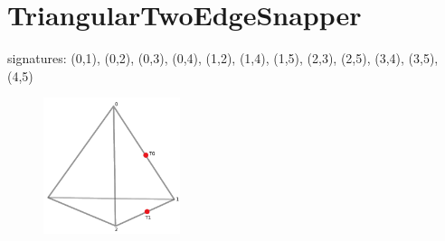 \documentclass{article}
\begin{document}
\begin{figure}[h!]
\end{figure}

\setcounter{subfigure}{0}
\clearpage

\section{TriangularTwoEdgeSnapper}

signatures: (0,1), (0,2), (0,3), (0,4), (1,2), (1,4), (1,5), (2,3),
(2,5), (3,4), (3,5), (4,5)

\begin{figure}[h!]
\includegraphics[width=4cm]{TriangularTwoEdgeSnapper}
\end{figure}
\end{document}
